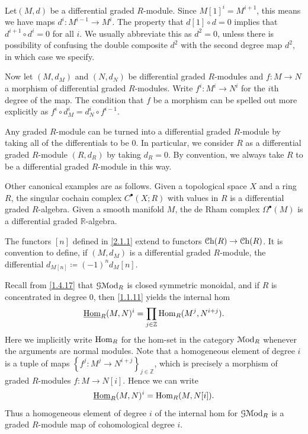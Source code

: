 \begin{discussion}\label{2.1.4}
	Let$(M,d)$ be a differential graded $R$-module. Since $M[1]^i=M^{i+1} $, this means we have maps $d^i : M^{i-1}  \to M^{i} $. The property that $d[1]\circ d=0$ implies that $d^{i+1} \circ d^i = 0$ for all $i$. We usually abbreviate this as $d^2=0$, unless there is possibility of confusing the double composite $d^2$ with the second degree map $d^2$, in which case we specify.

	Now let $(M,d_M)$ and $(N,d_N)$ be differential graded $R$-modules and $f : M \to N$ a morphism of differential graded $R$-modules. Write $f^i : M^i \to N^i$ for the $i$th degree of the map. The condition that $f$ be a morphism can be spelled out more explicitly as $f^{i} \circ d_M^i = d_N^i\circ f^{i-1}$.
\end{discussion}

\begin{example}\label{2.1.5}
	Any graded $R$-module can be turned into a differential graded $R$-module by taking all of the differentials to be 0. In particular, we consider $R$ as a differential graded $R$-module $(R,d_R)$ by taking $d_R=0$. By convention, we always take $R$ to be a differential graded $R$-module in this way.

	Other canonical examples are as follows. Given a topological space $X$ and a ring $R$, the singular cochain complex $C^{\bullet} (X;R)$ with values in $R$ is a differential graded $R$-algebra. Given a smooth manifold $M$, the de Rham complex $\Omega ^{\bullet} (M)$ is a differential graded $\mathbb{R} $-algebra.
\end{example}

\begin{discussion}\label{2.1.6}
	The functors $[n]$ defined in \cref{2.1.1} extend to functors $\mathcal{C}\mathrm{h}(R) \to \mathcal{C}\mathrm{h}(R) $. It is convention to define, if $(M,d_M)$ is a differential graded $R$-module, the differential $d_{M[n]} \coloneqq (-1)^{n} d_M[n]$.
\end{discussion}

\begin{remark}\label{2.1.7}
	Recall from \cref{1.4.17} that $\mathcal{G} \mathcal{M}\mathrm{od} _R$ is closed symmetric monoidal, and if $R$ is concentrated in degree 0, then \cref{1.1.11} yields the internal hom
	\[
		\underline{\operatorname{Hom}}_R(M,N)^i = \prod_{j\in\mathbb{Z} } \operatorname{Hom}_R(M^j, N^{i+j} ) 
	.\]
	Here we implicitly write $\operatorname{Hom}_R$ for the hom-set in the category $\mathcal{M}\mathrm{od} _R$ whenever the arguments are normal modules. Note that a homogeneous element of degree $i$ is a tuple of maps $\left\{f^j : M^j \to N^{i+j}\right\}_{j\in\mathbb{Z} }  $, which is precisely a morphism of graded $R$-modules $f : M \to N[i]$. Hence we can write
	\[
		\underline{\operatorname{Hom}}_R(M,N)^i = \operatorname{Hom}_R(M, N[i]) 
	.\]
	Thus a homogeneous element of degree $i$ of the internal hom for $\mathcal{G} \mathcal{M}\mathrm{od} _R$ is a graded $R$-module map of cohomological degree $i$.
\end{remark}

